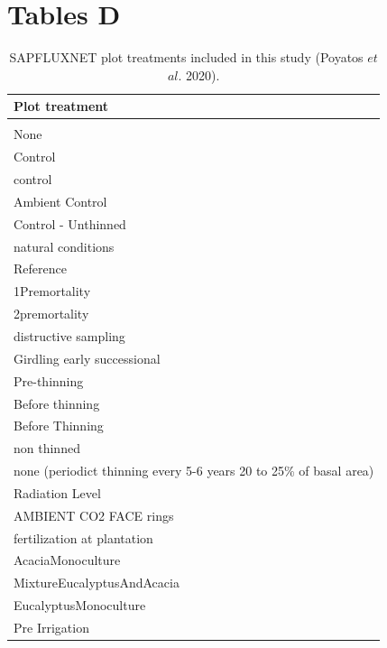 \documentclass[11pt,twoside]{reedthesis}
\begin{document}
\section{Tables D}\label{tables-d}
\begin{table}[H]

\caption{\label{tab:plottreatment}SAPFLUXNET plot treatments included in this study (Poyatos $et$ $al.$ 2020).}
\centering
\begin{tabular}[t]{l}
\toprule
Plot treatment\\
\midrule
\\
None\\
Control\\
control\\
Ambient Control\\
Control - Unthinned\\
natural conditions\\
Reference\\
1Premortality\\
2premortality\\
distructive sampling\\
Girdling early successional\\
Pre-thinning\\
Before thinning\\
Before Thinning\\
non thinned\\
none (periodict thinning every 5-6 years  20 to 25\% of basal area)\\
Radiation Level\\
AMBIENT CO2 FACE rings\\
fertilization at plantation\\
AcaciaMonoculture\\
MixtureEucalyptusAndAcacia\\
EucalyptusMonoculture\\
Pre Irrigation\\
\bottomrule
\end{tabular}
\end{table}
\begingroup\fontsize{4.5}{6.5}\selectfont
\end{document}
